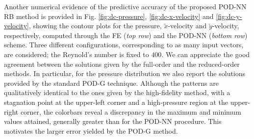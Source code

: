 \documentclass[12pt, a4paper, twoside, openright, notitlepage]{report}
\numberwithin{equation}{chapter}
\theoremstyle{theorem}
\theoremstyle{definition}
\theoremstyle{remark}
\theoremstyle{proposition}
\numberwithin{figure}{chapter}
\newcommand{\wt}[1]{\widetilde{#1}}
\begin{document}
		Another numerical evidence of the predictive accuracy of the proposed POD-NN RB method is provided in Fig. \ref{fig:dc-pressure}, \ref{fig:dc-x-velocity} and \ref{fig:dc-y-velocity}, showing the contour plots for the pressure, $\wt{x}$-velocity and $\wt{y}$-velocity, respectively, computed through the FE (\emph{top row}) and the POD-NN (\emph{bottom row}) scheme. Three different configurations, corresponding to as many input vectors, are considered; the Reynold's number is fixed to $400$. We can appreciate the good agreement between the solutions given by the full-order and the reduced-order methods. In particular, for the pressure distribution we also report the solutions provided by the standard POD-G technique. Although the patterns are qualitatively identical to the ones given by the high-fidelity method, with a stagnation point at the upper-left corner and a high-pressure region at the upper-right corner, the colorbars reveal a discrepancy in the maximum and minimum values attained, generally greater than for the POD-NN procedure. This motivates the larger error yielded by the POD-G method.
		
\end{document}
